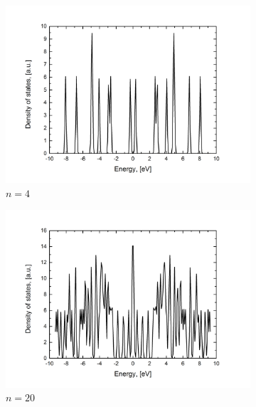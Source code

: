 \begin{figure}[hb!]
\centering
\begin{subfigure}{.45\textwidth}
  \centering
  \includegraphics[width=\linewidth]{img/zz_chain_4_dos}
  \caption{$n=4$}
  \label{fig:chain4}
\end{subfigure}%
\begin{subfigure}{.45\textwidth}
  \centering
  \includegraphics[width=\linewidth]{img/zz_chain_20_dos}
  \caption{$n=20$}
  \label{fig:chain20}
\end{subfigure}
\begin{subfigure}{.45\textwidth}
  \centering

\end{subfigure}
\end{figure}
